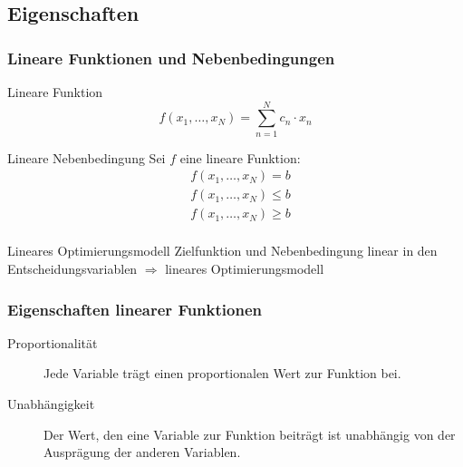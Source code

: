\subsection{Eigenschaften}
\begin{frame}\small
 \frametitle{Lineare Funktionen und Nebenbedingungen}
 \begin{block}{Lineare Funktion}
  \vspace{-2\baselineskip}
  \begin{equation*}
    f(x_1, \ldots, x_N) = \sum_{n=1}^{N} c_n\cdot x_n
  \end{equation*}
 \end{block}
 \vspace{-\baselineskip}
 \begin{block}{Lineare Nebenbedingung}
  Sei $f$ eine lineare Funktion:
  \begin{align*}
   &f(x_1, \ldots, x_N) = b\\
   &f(x_1, \ldots, x_N) \leq b\\
   &f(x_1, \ldots, x_N) \geq b\\
  \end{align*}
 \end{block}
 \vspace{-2\baselineskip}
 \begin{block}{Lineares Optimierungsmodell}
  Zielfunktion und Nebenbedingung linear in den Entscheidungsvariablen $\Longrightarrow$ lineares Optimierungsmodell
 \end{block}
\end{frame}

\begin{frame}
 \frametitle{Eigenschaften linearer Funktionen}
 \begin{description}
  \item[Proportionalität] Jede Variable trägt einen proportionalen Wert zur Funktion bei.
  \item[Unabhängigkeit] Der Wert, den eine Variable zur Funktion beiträgt ist unabhängig
von der Ausprägung der anderen Variablen.
 \end{description}

\end{frame}


